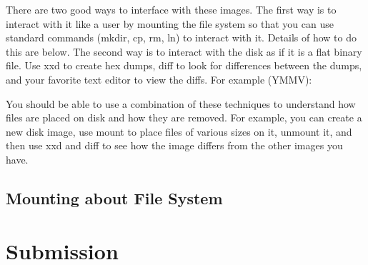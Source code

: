 \documentclass[12pt]{article}
\begin{document}
There are two good ways to interface with these images. The first way is to interact with it like a user by mounting the file system so that you can use standard commands (mkdir, cp, rm, ln) to interact with it. Details of how to do this are below. The second way is to interact with the disk as if it is a flat binary file. Use xxd to create hex dumps, diff to look for differences between the dumps, and your favorite text editor to view the diffs. For example (YMMV):

You should be able to use a combination of these techniques to understand how files are placed on disk and how they are removed. For example, you can create a new disk image, use mount to place files of various sizes on it, unmount it, and then use xxd and diff to see how the image differs from the other images you have.


\bigskip

\subsection{Mounting about File System}

\bigskip

\section{Submission}
\end{document}
